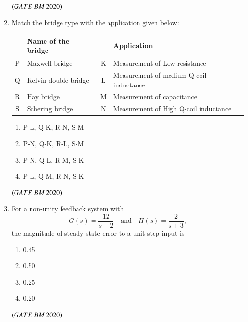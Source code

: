 \documentclass[journal,12pt,onecolumn]{IEEEtran}
\theoremstyle{remark}
\begin{document}
\begin{enumerate}
 \hfill $\brak{GATE\ BM\ 2020}$

\item Match the bridge type with the application given below:\\
\begin{center}
\begin{tabular}{|c|l|c|l|}
\hline
\textbf{} & \textbf{Name of the bridge} & \textbf{} & \textbf{Application} \\
\hline
P & Maxwell bridge & K & Measurement of Low resistance \\
\hline
Q & Kelvin double bridge & L & Measurement of medium Q-coil inductance \\
\hline
R & Hay bridge & M & Measurement of capacitance \\
\hline
S & Schering bridge & N & Measurement of High Q-coil inductance \\
\hline
\end{tabular}
\end{center}

\begin{enumerate}[label=\alph*)] 
\item\hspace{0.5cm}P-L, Q-K, R-N, S-M
\item\hspace{0.5cm}P-N, Q-K, R-L, S-M
\item\hspace{0.5cm}P-N, Q-L, R-M, S-K
\item\hspace{0.5cm}P-L, Q-M, R-N, S-K
\end{enumerate}
\hfill $\brak{GATE\ BM\ 2020}$

\item For a non-unity feedback system with  
\[
G(s) = \frac{12}{s + 2}
\quad \text{and} \quad
H(s) = \frac{2}{s + 3},
\]
the magnitude of steady-state error to a unit step-input is 

\begin{enumerate}[label=\alph*)] 
\item\hspace{0.5cm}0.45
\item\hspace{0.5cm}0.50
\item\hspace{0.5cm}0.25
\item\hspace{0.5cm}0.20
\end{enumerate}
\hfill $\brak{GATE\ BM\ 2020}$


\end{enumerate}
\end{document}
